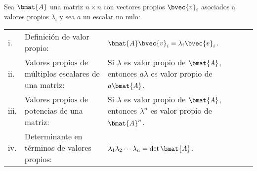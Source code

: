 \documentclass{fmbnotes}
\begin{document}
Sea \(\bmat{A}\) una matriz \(n \times n\) con vectores propios \(\bvec{v}_i\) asociados a valores propios \(\lambda_i\) y sea \(a\) un escalar no nulo:
\begin{longtable}{lp{}p{}}
	\rule[1ex]{0pt}{2.5ex}i.&Definición de valor propio: &\( \bmat{A} \bvec{v}_i=\lambda_i \bvec{v}_i \). \\
	\rule[2ex]{0pt}{2.5ex}ii.&Valores propios de múltiplos escalares de una matriz: & Si \(\lambda\) es valor propio de \(\bmat{A}\), entonces \(a\lambda\) es valor propio de \(a\bmat{A}\). \\
	\rule[1ex]{0pt}{2.5ex}iii.& Valores propios de potencias de una matriz: &Si \(\lambda\) es valor propio de \(\bmat{A}\), entonces \(\lambda^n\) es valor propio de \(\bmat{A}^n\). \\
	\rule[1ex]{0pt}{2.5ex}iv.&Determinante en términos de valores propios: & \(\lambda_1\lambda_2\cdots\lambda_n = \det\bmat{A}\). %
\end{longtable}
\end{document}
